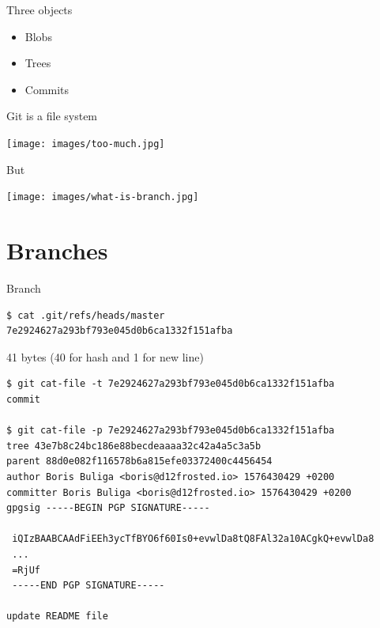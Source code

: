\documentclass[presentation,aspectratio=169,smaller]{beamer}
\begin{document}
\begin{frame}[label={sec:org0404b96}]{Three objects}
\begin{itemize}
\item Blobs
\item Trees
\item Commits
\end{itemize}
\end{frame}

\begin{frame}[label={sec:orge1bd294}]{Git is a file system}
\pause

\begin{center}
\texttt{[image: images/too-much.jpg]}
\end{center}
\end{frame}

\begin{frame}[label={sec:orgc1fde27}]{But}
\begin{center}
\texttt{[image: images/what-is-branch.jpg]}
\end{center}
\end{frame}

\section{Branches}
\label{sec:org06b3b7e}

\begin{frame}[label={sec:org0e369af},fragile]{Branch}
 \begin{verbatim}
$ cat .git/refs/heads/master
7e2924627a293bf793e045d0b6ca1332f151afba
\end{verbatim}

41 bytes (40 for hash and 1 for new line)

\pause

\begin{verbatim}
$ git cat-file -t 7e2924627a293bf793e045d0b6ca1332f151afba
commit

$ git cat-file -p 7e2924627a293bf793e045d0b6ca1332f151afba
tree 43e7b8c24bc186e88becdeaaaa32c42a4a5c3a5b
parent 88d0e082f116578b6a815efe03372400c4456454
author Boris Buliga <boris@d12frosted.io> 1576430429 +0200
committer Boris Buliga <boris@d12frosted.io> 1576430429 +0200
gpgsig -----BEGIN PGP SIGNATURE-----

 iQIzBAABCAAdFiEEh3ycTfBYO6f60Is0+evwlDa8tQ8FAl32a10ACgkQ+evwlDa8
 ...
 =RjUf
 -----END PGP SIGNATURE-----

update README file
\end{verbatim}
\end{frame}
\end{document}
